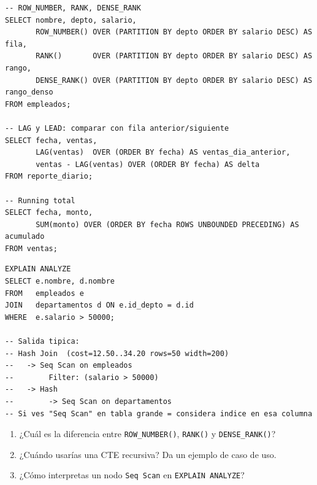 \begin{lstlisting}[caption={Window Functions}]
-- ROW_NUMBER, RANK, DENSE_RANK
SELECT nombre, depto, salario,
       ROW_NUMBER() OVER (PARTITION BY depto ORDER BY salario DESC) AS fila,
       RANK()       OVER (PARTITION BY depto ORDER BY salario DESC) AS rango,
       DENSE_RANK() OVER (PARTITION BY depto ORDER BY salario DESC) AS rango_denso
FROM empleados;

-- LAG y LEAD: comparar con fila anterior/siguiente
SELECT fecha, ventas,
       LAG(ventas)  OVER (ORDER BY fecha) AS ventas_dia_anterior,
       ventas - LAG(ventas) OVER (ORDER BY fecha) AS delta
FROM reporte_diario;

-- Running total
SELECT fecha, monto,
       SUM(monto) OVER (ORDER BY fecha ROWS UNBOUNDED PRECEDING) AS acumulado
FROM ventas;
\end{lstlisting}

\begin{lstlisting}[caption={EXPLAIN ANALYZE}]
EXPLAIN ANALYZE
SELECT e.nombre, d.nombre
FROM   empleados e
JOIN   departamentos d ON e.id_depto = d.id
WHERE  e.salario > 50000;

-- Salida tipica:
-- Hash Join  (cost=12.50..34.20 rows=50 width=200)
--   -> Seq Scan on empleados
--        Filter: (salario > 50000)
--   -> Hash
--        -> Seq Scan on departamentos
-- Si ves "Seq Scan" en tabla grande = considera indice en esa columna
\end{lstlisting}

\begin{entrevistabox}
\begin{enumerate}
  \item ¿Cuál es la diferencia entre \texttt{ROW\_NUMBER()}, \texttt{RANK()} y \texttt{DENSE\_RANK()}?
  \item ¿Cuándo usarías una CTE recursiva? Da un ejemplo de caso de uso.
  \item ¿Cómo interpretas un nodo \texttt{Seq Scan} en \texttt{EXPLAIN ANALYZE}?
\end{enumerate}
\end{entrevistabox}

